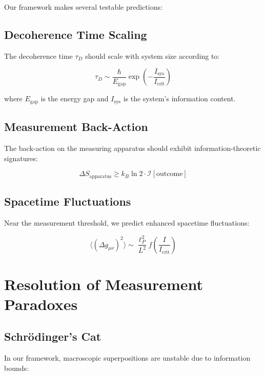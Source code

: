 \documentclass[12pt,a4paper]{article}
\theoremstyle{definition}
\begin{document}
Our framework makes several testable predictions:

\subsection{Decoherence Time Scaling}

The decoherence time $\tau_D$ should scale with system size according to:

\begin{equation}
\tau_D \sim \frac{\hbar}{E_{\text{gap}}} \exp\left(-\frac{I_{\text{sys}}}{I_{\text{crit}}}\right)
\end{equation}

where $E_{\text{gap}}$ is the energy gap and $I_{\text{sys}}$ is the system's information content.

\subsection{Measurement Back-Action}

The back-action on the measuring apparatus should exhibit information-theoretic signatures:

\begin{equation}
\Delta S_{\text{apparatus}} \geq k_B \ln 2 \cdot \mathcal{I}[\text{outcome}]
\end{equation}

\subsection{Spacetime Fluctuations}

Near the measurement threshold, we predict enhanced spacetime fluctuations:

\begin{equation}
\langle (\Delta g_{\mu\nu})^2 \rangle \sim \frac{\ell_P^2}{L^2} f\left(\frac{I}{I_{\text{crit}}}\right)
\end{equation}

\section{Resolution of Measurement Paradoxes}

\subsection{Schrödinger's Cat}

In our framework, macroscopic superpositions are unstable due to information bounds:
\end{document}
